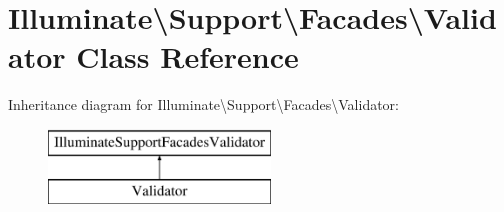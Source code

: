 \hypertarget{class_illuminate_1_1_support_1_1_facades_1_1_validator}{}\section{Illuminate\textbackslash{}Support\textbackslash{}Facades\textbackslash{}Validator Class Reference}
\label{class_illuminate_1_1_support_1_1_facades_1_1_validator}
Inheritance diagram for Illuminate\textbackslash{}Support\textbackslash{}Facades\textbackslash{}Validator\+:\begin{figure}[H]
\begin{center}
\leavevmode
\includegraphics[height=2.000000cm]{class_illuminate_1_1_support_1_1_facades_1_1_validator}
\end{center}
\end{figure}
